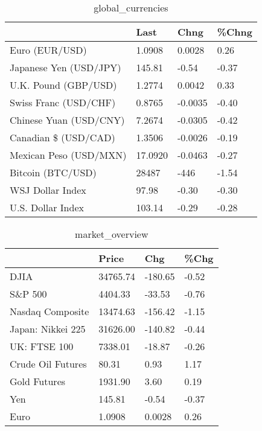 \documentclass{article}%
\begin{document}
%


\begin{table}[htbp]%
\caption{global\_currencies}%
\centering%
\begin{adjustbox}{width=1\textwidth}%
\begin{tabular}{llll}
\toprule
                       &    Last &    Chng & \%Chng \\
\midrule
        Euro (EUR/USD) &  1.0908 &  0.0028 &  0.26 \\
Japanese Yen (USD/JPY) &  145.81 &   -0.54 & -0.37 \\
  U.K. Pound (GBP/USD) &  1.2774 &  0.0042 &  0.33 \\
 Swiss Franc (USD/CHF) &  0.8765 & -0.0035 & -0.40 \\
Chinese Yuan (USD/CNY) &  7.2674 & -0.0305 & -0.42 \\
  Canadian \$ (USD/CAD) &  1.3506 & -0.0026 & -0.19 \\
Mexican Peso (USD/MXN) & 17.0920 & -0.0463 & -0.27 \\
     Bitcoin (BTC/USD) &   28487 &    -446 & -1.54 \\
      WSJ Dollar Index &   97.98 &   -0.30 & -0.30 \\
     U.S. Dollar Index &  103.14 &   -0.29 & -0.28 \\
\bottomrule
\end{tabular}
%
\end{adjustbox}%
\end{table}

%


\begin{table}[htbp]%
\caption{market\_overview}%
\centering%
\begin{adjustbox}{width=1\textwidth}%
\begin{tabular}{llll}
\toprule
                  &    Price &     Chg &  \%Chg \\
\midrule
             DJIA & 34765.74 & -180.65 & -0.52 \\
          S\&P 500 &  4404.33 &  -33.53 & -0.76 \\
 Nasdaq Composite & 13474.63 & -156.42 & -1.15 \\
Japan: Nikkei 225 & 31626.00 & -140.82 & -0.44 \\
     UK: FTSE 100 &  7338.01 &  -18.87 & -0.26 \\
Crude Oil Futures &    80.31 &    0.93 &  1.17 \\
     Gold Futures &  1931.90 &    3.60 &  0.19 \\
              Yen &   145.81 &   -0.54 & -0.37 \\
             Euro &   1.0908 &  0.0028 &  0.26 \\
\bottomrule
\end{tabular}
%
\end{adjustbox}%
\end{table}

%
\end{document}
